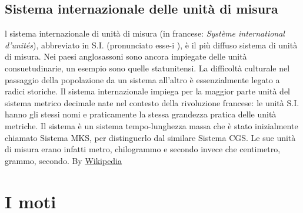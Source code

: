 \documentclass{book}
\begin{document}
\section{Sistema internazionale delle unità di misura}
l sistema internazionale di unità di misura (in francese: \textit{Système international d'unités}), abbreviato in S.I. (pronunciato esse-i
), è il più diffuso sistema di unità di misura. Nei paesi anglosassoni sono ancora impiegate delle unità consuetudinarie, un esempio sono quelle statunitensi.
La difficoltà culturale nel passaggio della popolazione da un sistema all'altro è essenzialmente legato a radici storiche. Il sistema internazionale impiega per la maggior parte unità del sistema metrico decimale nate nel contesto della rivoluzione francese: le unità S.I. hanno gli stessi nomi e praticamente la stessa grandezza pratica delle unità metriche. Il sistema è un sistema tempo-lunghezza massa che è stato inizialmente chiamato Sistema MKS, per distinguerlo dal similare Sistema CGS. Le sue unità di misura erano infatti metro, chilogrammo e secondo invece che centimetro, grammo, secondo. By \href{https://it.wikipedia.org/wiki/Sistema_internazionale_di_unità_di_misura}{Wikipedia}

\chapter{I moti}
\end{document}
